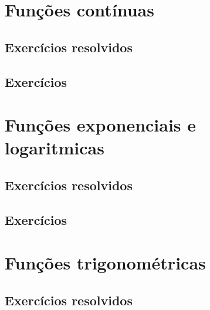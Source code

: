 \construirExer


\section{Funções contínuas}\label{sec:limites_fun_cont}
\construirSec

\subsection*{Exercícios resolvidos}

\construirExeresol


\subsection*{Exercícios}

\construirExer


\section{Funções exponenciais e logaritmicas}\label{sec:limites_exp_log}
\construirSec

\subsection*{Exercícios resolvidos}

\construirExeresol


\subsection*{Exercícios}

\construirExer


\section{Funções trigonométricas}\label{sec:limites_fun_trigo} %
\construirSec

\subsection*{Exercícios resolvidos}

